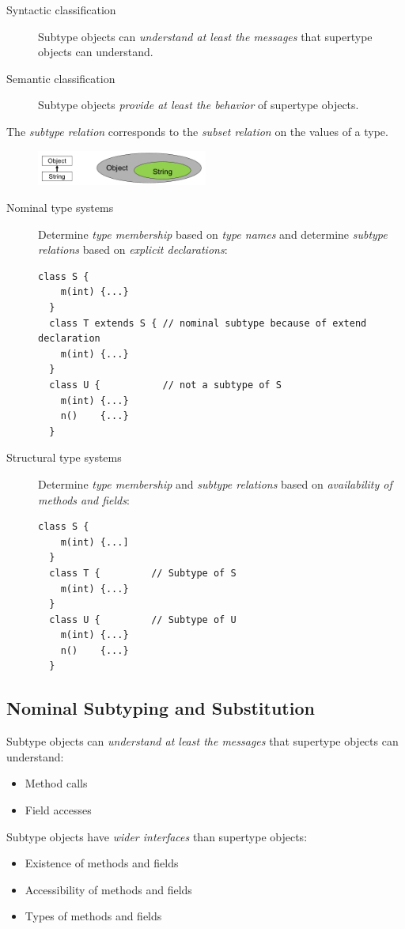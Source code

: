 \begin{description}
 \item[Syntactic classification] Subtype objects can \emph{understand at least the messages} that supertype objects can understand.
 \item[Semantic classification] Subtype objects \emph{provide at least the behavior} of supertype objects.
\end{description}

The \emph{subtype relation} corresponds to the \emph{subset relation} on the values of a type.
\begin{figure}[h!]
  \centering
    \includegraphics[width=0.5\textwidth]{img/02_subtype_relation}
\end{figure}

\begin{description}
 \item[Nominal type systems] Determine \emph{type membership} based on \emph{type names} and determine \emph{subtype relations} based on \emph{explicit declarations}:
 \lstset{language=Java}
 \begin{lstlisting}[caption=nominally typed language]
  class S { 
    m(int) {...} 
  }
  class T extends S { // nominal subtype because of extend declaration
    m(int) {...} 
  }
  class U {           // not a subtype of S
    m(int) {...}
    n()    {...}
  }
 \end{lstlisting}
  \item[Structural type systems] Determine \emph{type membership} and \emph{subtype relations} based on \emph{availability of methods and fields}:
  \begin{lstlisting}[caption=structurally typed language]
  class S {
    m(int) {...]
  }
  class T {         // Subtype of S
    m(int) {...}
  }
  class U {         // Subtype of U
    m(int) {...}
    n()    {...}
  }
  \end{lstlisting}

\end{description}

\subsection{Nominal Subtyping and Substitution}
Subtype objects can \emph{understand at least the messages} that supertype objects can understand:
\begin{itemize}
 \item Method calls
 \item Field accesses
\end{itemize}
Subtype objects have \emph{wider interfaces} than supertype objects:
\begin{itemize}
 \item Existence of methods and fields
 \item Accessibility of methods and fields
 \item Types of methods and fields
\end{itemize}

